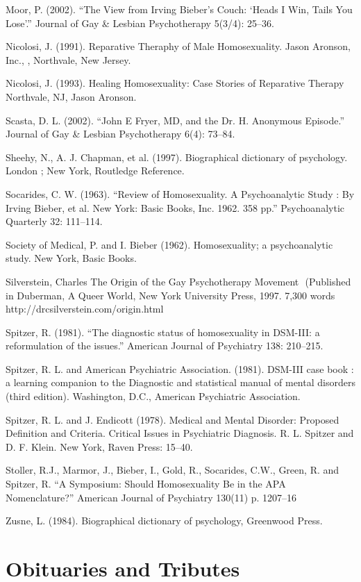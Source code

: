 \begin{refsection}
\begin{appendices}
Moor, P. (2002). ``The View from Irving Bieber's Couch: `Heads I Win, Tails You Lose'.'' Journal of Gay \& Lesbian Psychotherapy 5(3\slash 4): 25--36.

Nicolosi, J. (1991). Reparative Theraphy of Male Homosexuality. Jason Aronson, Inc., , Northvale, New Jersey.

Nicolosi, J. (1993). Healing Homosexuality: Case Stories of Reparative Therapy Northvale, NJ, Jason Aronson.

Scasta, D. L. (2002). ``John E Fryer, MD, and the Dr. H. Anonymous Episode.'' Journal of Gay \& Lesbian Psychotherapy 6(4): 73--84.

Sheehy, N., A. J. Chapman, et al. (1997). Biographical dictionary of psychology. London ; New York, Routledge Reference.

Socarides, C. W. (1963). ``Review of Homosexuality. A Psychoanalytic Study : By Irving Bieber, et al. New York: Basic Books, Inc. 1962. 358 pp.'' Psychoanalytic Quarterly 32: 111--114.

Society of Medical, P. and I. Bieber (1962). Homosexuality; a psychoanalytic study. New York, Basic Books.

Silverstein, Charles The Origin of the Gay Psychotherapy Movement
 (Published in Duberman, A Queer World, New York University Press, 1997. 7,300 words http:\slash \slash drcsilverstein.com\slash origin.html

Spitzer, R. (1981). ``The diagnostic status of homosexuality in DSM-III: a reformulation of the issues.'' American Journal of Psychiatry 138: 210--215.

Spitzer, R. L. and American Psychiatric Association. (1981). DSM-III case book : a learning companion to the Diagnostic and statistical manual of mental disorders (third edition). Washington, D.C., American Psychiatric Association.

Spitzer, R. L. and J. Endicott (1978). Medical and Mental Disorder: Proposed Definition and Criteria. Critical Issues in Psychiatric Diagnosis. R. L. Spitzer and D. F. Klein. New York, Raven Press: 15--40.

Stoller, R.J., Marmor, J., Bieber, I., Gold, R., Socarides, C.W., Green, R. and Spitzer, R. “A Symposium: Should Homosexuality Be in the APA Nomenclature?” American Journal of Psychiatry 130(11) p. 1207--16

Zusne, L. (1984). Biographical dictionary of psychology, Greenwood Press.

\section{Obituaries and Tributes}
\label{obituariesandtributes}


\end{appendices}
\end{refsection}

